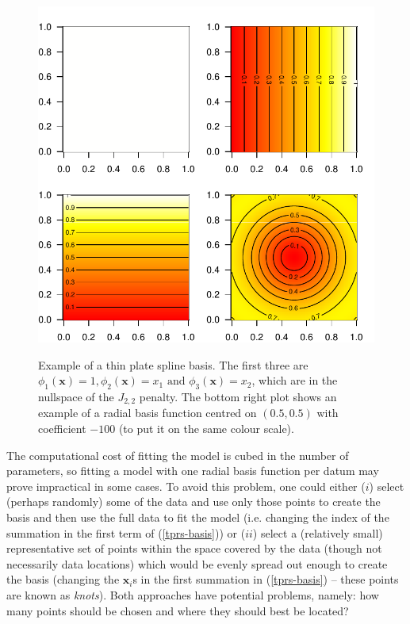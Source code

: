 \begin{figure}[p]
\centering
\includegraphics[width=\textwidth]{intro/figs/tprsex.pdf}\\
\caption{Example of a thin plate spline basis. The first three are $\phi_1(\mathbf{x})=1, \phi_2(\mathbf{x})=x_1 \text{ and } \phi_3(\mathbf{x})=x_2$, which are in the nullspace of the $J_{2,2}$ penalty. The bottom right plot shows an example of a radial basis function centred on $(0.5,0.5)$ with coefficient $-100$ (to put it on the same colour scale).}
\label{tprs-basis-fig}
\end{figure}

The computational cost of fitting the model is cubed in the number of parameters, so fitting a model with one radial basis function per datum may prove impractical in some cases. To avoid this problem, one could either ($i$) select (perhaps randomly) some of the data and use only those points to create the basis and then use the full data to fit the model (i.e. changing the index of the summation in the first term of (\ref{tprs-basis})) or ($ii$) select a (relatively small) representative set of points within the space covered by the data (though not necessarily data locations) which would be evenly spread out enough to create the basis (changing the $\mathbf{x}_i$s in the first summation in (\ref{tprs-basis}) -- these points are known as \textit{knots}). Both approaches have potential problems, namely: how many points should be chosen and where they should best be located?

